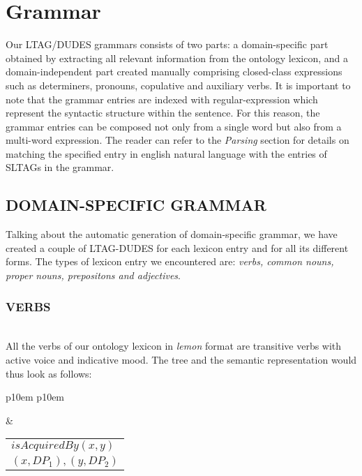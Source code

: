 \section{Grammar}
\label{sec:grammar}

Our LTAG/DUDES grammars consists of two parts: a domain-specific part obtained by extracting all relevant information from the ontology lexicon, and a domain-independent part created manually comprising closed-class expressions such as determiners, pronouns, copulative and auxiliary verbs. It is important to note that the grammar entries are indexed with regular-expression which represent the syntactic structure within the sentence. For this reason, the grammar entries can be composed not only from a single word but also from a multi-word expression. The reader can refer to the \textit{Parsing} section for details on matching the specified entry in english natural language with the entries of SLTAGs in the grammar.

\subsection{DOMAIN-SPECIFIC GRAMMAR}
Talking about the automatic generation of domain-specific grammar, we have created a couple of LTAG-DUDES for each lexicon entry and for all its different forms. The types of lexicon entry we encountered are: \textit{verbs, common nouns, proper nouns, prepositons and adjectives}.

\subsubsection{VERBS}\mbox{}\\
All the verbs of our ontology lexicon in \textit{lemon} format are transitive verbs with active voice and indicative mood. The tree and the semantic representation would thus look as follows:

\medskip
\begin{center}
\begin{tabular}{ p{10em} p{10em} }
	\label{tbl:grammar.acquire}
	
	\begin{center}
		\begin{tikzpicture}
		\Tree [.S [.DP$_1\downarrow$ ] [.VP [.V acquire ] DP$_2\downarrow$ ] ]	
		\end{tikzpicture}
	\end{center}
	
	&

	\begin{center}
		\begin{tabular}{|c|l|}
			\hline
			\mbox{} & \mbox{}\\
			\hline
			\multicolumn{2}{|l|}{
				$isAcquiredBy(x,y)$
			} \\
			\hline
			\multicolumn{2}{|l|}{
				$(x,DP_{1}),(y,DP_{2})$
			} \\
			\hline
		\end{tabular}
	\end{center}	
	\\
\end{tabular}
\end{center}
\medskip

